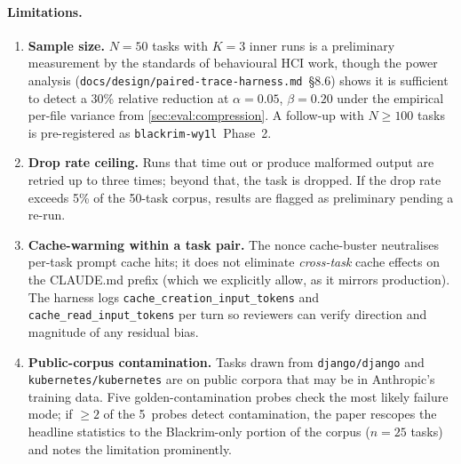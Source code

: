 \paragraph{Limitations.}\label{sec:eval:e2e:limits}
\begin{enumerate}[leftmargin=*,nosep]
  \item \textbf{Sample size.}  $N{=}50$ tasks with $K{=}3$ inner runs
        is a preliminary measurement by the standards of behavioural
        HCI work, though the power analysis
        (\texttt{docs/design/paired-trace-harness.md}~\S8.6) shows
        it is sufficient to detect a 30\% relative reduction at
        $\alpha{=}0.05$, $\beta{=}0.20$ under the empirical per-file
        variance from \cref{sec:eval:compression}.  A follow-up with
        $N \geq 100$ tasks is pre-registered as
        \texttt{blackrim-wy1l}~Phase~2.

  \item \textbf{Drop rate ceiling.}  Runs that time out or produce
        malformed output are retried up to three times; beyond that,
        the task is dropped.  If the drop rate exceeds 5\% of the
        50-task corpus, results are flagged as preliminary pending a
        re-run.

  \item \textbf{Cache-warming within a task pair.}  The nonce
        cache-buster neutralises per-task prompt cache hits; it does
        not eliminate \emph{cross-task} cache effects on the CLAUDE.md
        prefix (which we explicitly allow, as it mirrors production).
        The harness logs \texttt{cache\_creation\_input\_tokens} and
        \texttt{cache\_read\_input\_tokens} per turn so reviewers can
        verify direction and magnitude of any residual bias.

  \item \textbf{Public-corpus contamination.}  Tasks drawn from
        \texttt{django/django} and \texttt{kubernetes/kubernetes} are
        on public corpora that may be in Anthropic's training data.
        Five golden-contamination probes check the most likely failure
        mode; if $\geq 2$ of the 5~probes detect contamination, the
        paper rescopes the headline statistics to the Blackrim-only
        portion of the corpus ($n{=}25$ tasks) and notes the limitation
        prominently.


\end{enumerate}
